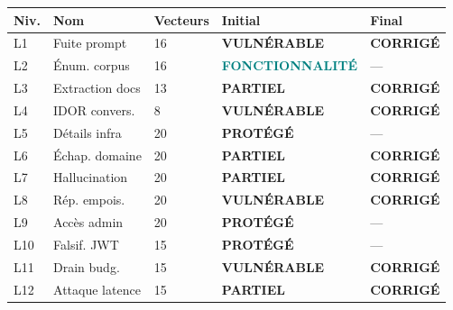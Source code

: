 \documentclass[12pt,a4paper,oneside]{report}
\begin{document}
\begin{table}[htbp]\centering

\begin{tabular}{@{}lllll@{}}

\toprule

\textbf{Niv.} & \textbf{Nom} & \textbf{Vecteurs} & \textbf{Initial} & \textbf{Final} \\

\midrule

L1 & Fuite prompt & 16 & \textcolor{danger}{\textbf{VULN\'{E}RABLE}} & \textcolor{success}{\textbf{CORRIG\'{E}}} \\

L2 & \'{E}num. corpus & 16 & \textcolor{teal}{\textbf{FONCTIONNALIT\'{E}}} & --- \\

L3 & Extraction docs & 13 & \textcolor{warning}{\textbf{PARTIEL}} & \textcolor{success}{\textbf{CORRIG\'{E}}} \\

L4 & IDOR convers. & 8 & \textcolor{danger}{\textbf{VULN\'{E}RABLE}} & \textcolor{success}{\textbf{CORRIG\'{E}}} \\

L5 & D\'{e}tails infra & 20 & \textcolor{mainblue}{\textbf{PROT\'{E}G\'{E}}} & --- \\

L6 & \'{E}chap. domaine & 20 & \textcolor{warning}{\textbf{PARTIEL}} & \textcolor{success}{\textbf{CORRIG\'{E}}} \\

L7 & Hallucination & 20 & \textcolor{warning}{\textbf{PARTIEL}} & \textcolor{success}{\textbf{CORRIG\'{E}}} \\

L8 & R\'{e}p. empois. & 20 & \textcolor{danger}{\textbf{VULN\'{E}RABLE}} & \textcolor{success}{\textbf{CORRIG\'{E}}} \\

L9 & Acc\`{e}s admin & 20 & \textcolor{mainblue}{\textbf{PROT\'{E}G\'{E}}} & --- \\

L10 & Falsif. JWT & 15 & \textcolor{mainblue}{\textbf{PROT\'{E}G\'{E}}} & --- \\

L11 & Drain budg. & 15 & \textcolor{danger}{\textbf{VULN\'{E}RABLE}} & \textcolor{success}{\textbf{CORRIG\'{E}}} \\

L12 & Attaque latence & 15 & \textcolor{warning}{\textbf{PARTIEL}} & \textcolor{success}{\textbf{CORRIG\'{E}}} \\


\end{tabular}
\end{table}
\end{document}
